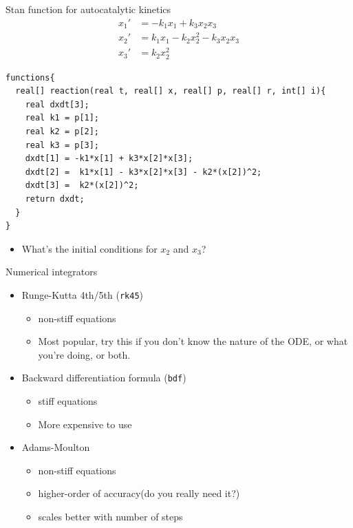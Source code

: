 \documentclass[presentation, allowframebreaks]{beamer}
\begin{document}
\begin{frame}[fragile,label={sec:org117c742}]{Stan function for autocatalytic kinetics}
 \begin{align*}
x_1' &= -k_1x_1 + k_3x_2x_3\\
x_2' &=  k_1x_1 - k_2x_2^2 - k_3x_2x_3\\
x_3' &=  k_2x_2^2
\end{align*}

\begin{verbatim}
functions{
  real[] reaction(real t, real[] x, real[] p, real[] r, int[] i){
    real dxdt[3];
    real k1 = p[1];
    real k2 = p[2];
    real k3 = p[3];
    dxdt[1] = -k1*x[1] + k3*x[2]*x[3];
    dxdt[2] =  k1*x[1] - k3*x[2]*x[3] - k2*(x[2])^2;
    dxdt[3] =  k2*(x[2])^2;
    return dxdt;
  }
}
\end{verbatim}
\begin{itemize}
\item What's the initial conditions for \(x_2\) and \(x_3\)?
\end{itemize}
\end{frame}

\begin{frame}[fragile,label={sec:org7aaff37}]{Numerical integrators}
 \begin{itemize}
\item Runge-Kutta 4th/5th (\texttt{rk45})
\begin{itemize}
\item non-stiff equations
\item Most popular, try this if you don't know the nature of the ODE, or what you're doing, or both.
\end{itemize}
\item Backward differentiation formula (\texttt{bdf})
\begin{itemize}
\item stiff equations
\item More expensive to use
\end{itemize}
\item Adams-Moulton
\begin{itemize}
\item non-stiff equations
\item higher-order of accuracy(do you really need it?)
\item scales better with number of steps
\end{itemize}
\end{itemize}
\end{frame}
\end{document}
